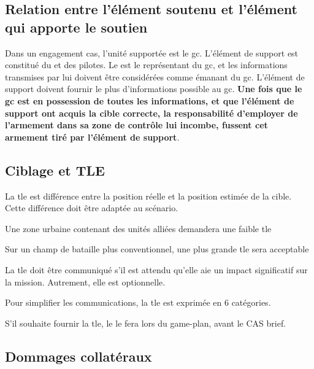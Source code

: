 \subsection{Relation entre l'élément soutenu et l'élément qui apporte le soutien}


Dans un engagement \gls{cas}, l'unité supportée est le \gls{gc}. L'élément de support est constitué du \ja{} et des pilotes. Le \ja{} est le représentant du \gls{gc}, et les informations transmises par lui doivent être considérées comme émanant du \gls{gc}. L'élément de support doivent fournir le plus d'informations possible au \gls{gc}. \textbf{Une fois que le \gls{gc} est en possession de toutes les informations, et que l'élément de support ont acquis la cible correcte, la responsabilité d'employer de l'armement dans sa zone de contrôle lui incombe, fussent cet armement tiré par l'élément de support}.

\subsection{Ciblage et TLE}

\e
	\item La \gls{tle} est différence entre la position réelle et la position estimée de la cible. Cette différence doit être adaptée au scénario.

	\ee
		\item Une zone urbaine contenant des unités alliées demandera une faible \gls{tle}
		\item Sur un champ de bataille plus conventionnel, une plus grande \gls{tle} sera acceptable
	\ed
	
	\item La \gls{tle} doit être communiqué s'il est attendu qu'elle aie un impact significatif sur la mission. Autrement, elle est optionnelle.

	\item Pour simplifier les communications, la \gls{tle} est exprimée en 6 catégories.

	
	
	\item S'il souhaite fournir la \gls{tle}, le \ja{} le fera lors du game-plan, avant le CAS brief.
\ed

\subsection{Dommages collatéraux}

